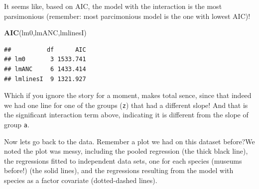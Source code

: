 \documentclass[
]{book}
\newenvironment{Shaded}{\begin{snugshade}}{\end{snugshade}}
\newcommand{\KeywordTok}[1]{\textcolor[rgb]{0.13,0.29,0.53}{\textbf{#1}}}
\newcommand{\NormalTok}[1]{#1}
\begin{document}
It seems like, based on AIC, the model with the interaction is the most parsimonious (remember: most parcimonious model is the one with lowest AIC)!

\begin{Shaded}
\begin{Highlighting}[]
\KeywordTok{AIC}\NormalTok{(lm0,lmANC,lmlinesI)}
\end{Highlighting}
\end{Shaded}

\begin{verbatim}
##          df      AIC
## lm0       3 1533.741
## lmANC     6 1433.414
## lmlinesI  9 1321.927
\end{verbatim}

Which if you ignore the story for a moment, makes total sence, since that indeed we had one line for one of the groups (\texttt{z}) that had a different slope! And that is the significant interaction term above, indicating it is different from the slope of group \texttt{a}.

Now lets go back to the data. Remember a plot we had on this dataset before?We noted the plot was messy, including the pooled regression (the thick black line), the regressions fitted to independent data sets, one for each species (museums before!) (the solid lines), and the regressions resulting from the model with species as a factor covariate (dotted-dashed lines).
\end{document}
